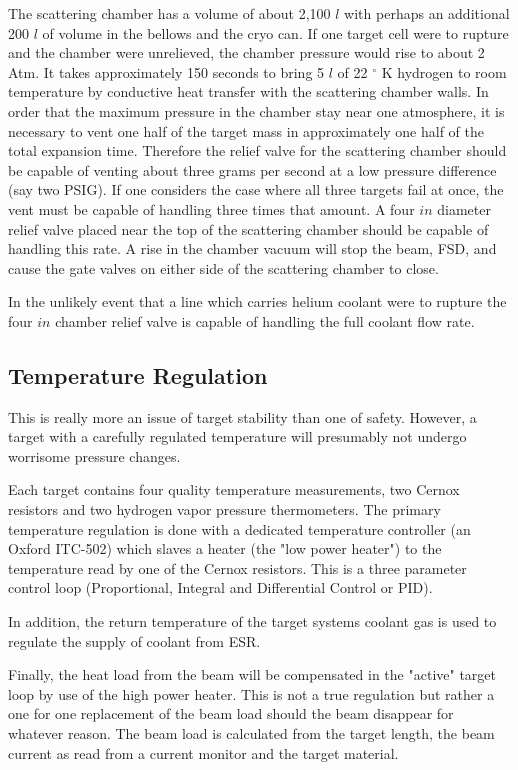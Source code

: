 The scattering chamber has a volume of about 2,100 $l$ with perhaps an 
additional 200 $l$ of volume in the bellows and the cryo can.
If one target cell were to rupture and the chamber were unrelieved,
the chamber pressure would rise to about 2 Atm.
It takes approximately 150 seconds to
bring 5 $l$ of 22 $^\circ$ K hydrogen to room temperature
by conductive heat transfer with the scattering chamber walls.
In order that the maximum pressure 
in the chamber stay near one atmosphere, it is necessary to
vent one half of the target mass in approximately one half of the
total expansion time. Therefore the relief valve for the scattering chamber
should be capable of venting about three grams per second
at a low pressure difference (say two PSIG).
If one considers the case where all three targets
fail at once, the vent must be capable of handling three times
that amount. A four $in$ diameter relief valve placed near the
top of the scattering chamber should be capable of handling this rate.
A rise in the chamber vacuum will stop the beam, FSD, and
cause the gate valves on either side of the scattering chamber to
close. 

In the unlikely event that a line which carries helium coolant
were to rupture the four $in$ chamber relief valve is capable
of handling the full coolant flow rate.

\subsection{ Temperature Regulation}

This is really more an issue of target stability than one of
safety. However, a target with a carefully regulated temperature
will presumably not undergo worrisome pressure changes.

Each target contains four quality temperature measurements, two Cernox
resistors and two hydrogen vapor pressure thermometers. The primary
temperature regulation is done with a dedicated temperature controller
(an Oxford ITC-502) which slaves a heater (the "low power heater") 
to the temperature read by one of the Cernox resistors.
This is a three parameter control loop (Proportional, Integral and Differential
Control or PID).

In addition, the return temperature of the target systems coolant
gas is used to regulate the supply of coolant from ESR.

Finally, the heat load from the beam will be compensated in the "active"
target loop by use of the high power heater. This is not a true regulation
but rather a one for one replacement of the beam load should the beam
disappear for whatever reason. The beam load is calculated from the
target length, the beam current as read from a current monitor and
the target material.

